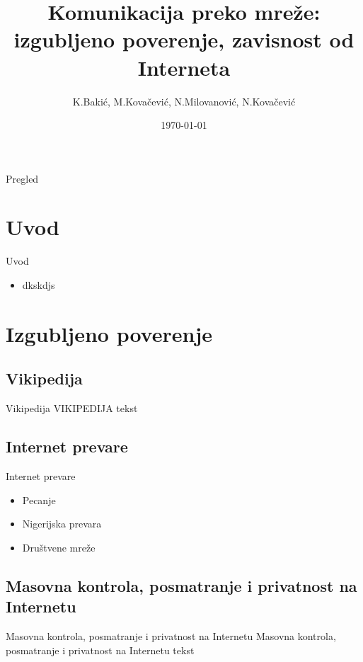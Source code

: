 \documentclass{beamer}
\title{Komunikacija preko mreže:\\izgubljeno poverenje, zavisnost od Interneta}
\author{K.Bakić, M.Kovačević, N.Milovanović, N.Kovačević}
\date{\today}
\begin{document}
\begin{frame}
  \titlepage
\end{frame}


\begin{frame}{Pregled}
 \tableofcontents
\end{frame}

\section{Uvod}
	\begin{frame}{Uvod}
		\begin{itemize}
		\item dkskdjs
		\end{itemize}
	\end{frame}
\section{Izgubljeno poverenje}
	\subsection*{Vikipedija}
		\begin{frame}{Vikipedija}
			VIKIPEDIJA tekst
		\end{frame}

	\subsection*{Internet prevare}
		\begin{frame}{Internet prevare}
			\begin{itemize}
				\item Pecanje
				\item Nigerijska prevara
				\item Društvene mreže
			\end{itemize}
		\end{frame}
	\subsection*{Masovna kontrola, posmatranje i privatnost na Internetu}
		\begin{frame}{Masovna kontrola, posmatranje i privatnost na Internetu}
			Masovna kontrola, posmatranje i privatnost na Internetu tekst
		\end{frame}
	
\end{document}
